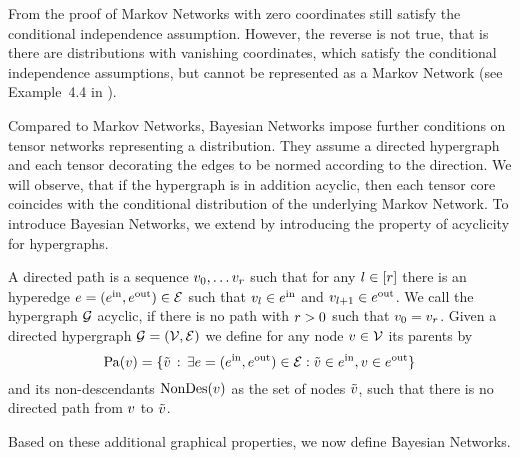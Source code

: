 From the proof of  Markov Networks with zero coordinates still satisfy the conditional independence assumption.
However, the reverse is not true, that is there are distributions with vanishing coordinates, which satisfy the conditional independence assumptions, but cannot be represented as a Markov Network (see Example~4.4 in \cite{koller_probabilistic_2009}).





Compared to Markov Networks, Bayesian Networks impose further conditions on tensor networks representing a distribution.
They assume a directed hypergraph and each tensor decorating the edges to be normed according to the direction.
We will observe, that if the hypergraph is in addition acyclic, then each tensor core coincides with the conditional distribution of the underlying Markov Network.
To introduce Bayesian Networks, we extend  by introducing the property of acyclicity for hypergraphs.


\begin{definition}
    A directed path is a sequence $v_{0},\ldots v_{r}$ such that for any $l\in[r]$ there is an hyperedge $e=(e^{\mathrm{in}},e^{\mathrm{out}})\in\mathcal{E}$ such that $v_{l}\in e^{\mathrm{in}}$ and $v_{l+1}\in e^{\mathrm{out}}$.
    We call the hypergraph $\mathcal{G}$ acyclic, if there is no path with $r>0$ such that $v_{0}=v_{r}$.
    Given a directed hypergraph $\mathcal{G}=(\mathcal{V},\mathcal{E})$ we define for any node $v\in\mathcal{V}$ its parents by
    \[ \mathrm{Pa}(v) = \{\tilde{v} \, : \, \exists e=(e^{\mathrm{in}},e^{\mathrm{out}})\in\mathcal{E}: \tilde{v}\in e^{\mathrm{in}},v\in e^{\mathrm{out}} \} \]
    and its non-descendants $\mathrm{NonDes}(v)$ as the set of nodes $\tilde{v}$, such that there is no directed path from $v$ to $\tilde{v}$.
\end{definition}

Based on these additional graphical properties, we now define Bayesian Networks.

